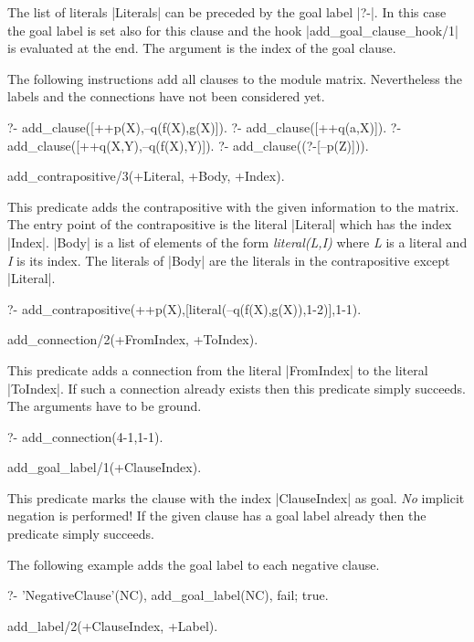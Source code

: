 The list of literals |Literals| can be preceded by the goal label |?-|. In
this case the goal label is set also for this clause and the hook
|add_goal_clause_hook/1| is evaluated at the end. The argument is the index of
the goal clause.

The following instructions add all clauses to the module {\sf
  matrix}. Nevertheless the labels and the connections have not been considered yet.
\begin{BoxedSample}
  ?- add\_clause([++p(X),--q(f(X),g(X)]).
  ?- add\_clause([++q(a,X)]).
  ?- add\_clause([++q(X,Y),--q(f(X),Y)]).
  ?- add\_clause((?-[--p(Z)])).
\end{BoxedSample}

\Predicate add_contrapositive/3(+Literal, +Body, +Index).

This predicate adds the contrapositive with the given information to the
matrix. The entry point of the contrapositive is the literal |Literal| which
has the index |Index|. |Body| is a list of elements of the form {\em
  literal(L,I)}\/ where {\em L}\/ is a literal and {\em I}\/ is its index. The
literals of |Body| are the literals in the contrapositive except |Literal|.

\begin{BoxedSample}
  ?- add\_contrapositive(++p(X),[literal(--q(f(X),g(X)),1-2)],1-1).
\end{BoxedSample}

\Predicate add_connection/2(+FromIndex, +ToIndex).

This predicate adds a connection from the literal |FromIndex| to the literal
|ToIndex|. If such a connection already exists then this predicate simply
succeeds. The arguments have to be ground.
\begin{BoxedSample}
  ?- add\_connection(4-1,1-1).
\end{BoxedSample}


\Predicate add_goal_label/1(+ClauseIndex).

This predicate marks the clause with the index |ClauseIndex| as goal. {\em
  No}\/ implicit negation is performed! If the given clause has a goal
label already then the predicate simply succeeds.

The following example adds the goal label to each negative clause.
\begin{BoxedSample}
  ?- 'NegativeClause'(NC), add\_goal\_label(NC), fail; true.
\end{BoxedSample}

\Predicate add_label/2(+ClauseIndex, +Label).

